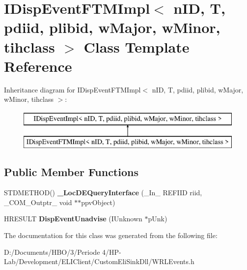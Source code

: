 \hypertarget{class_i_disp_event_f_t_m_impl}{}\section{I\+Disp\+Event\+F\+T\+M\+Impl$<$ n\+ID, T, pdiid, plibid, w\+Major, w\+Minor, tihclass $>$ Class Template Reference}
\label{class_i_disp_event_f_t_m_impl}
Inheritance diagram for I\+Disp\+Event\+F\+T\+M\+Impl$<$ n\+ID, T, pdiid, plibid, w\+Major, w\+Minor, tihclass $>$\+:\begin{figure}[H]
\begin{center}
\leavevmode
\includegraphics[height=2.000000cm]{dd/d17/class_i_disp_event_f_t_m_impl}
\end{center}
\end{figure}
\subsection*{Public Member Functions}
\begin{DoxyCompactItemize}
\item 
\mbox{\label{class_i_disp_event_f_t_m_impl_a232b97b0e6a288add95c789422a58cef}} 
S\+T\+D\+M\+E\+T\+H\+OD() {\bfseries \+\_\+\+Loc\+D\+E\+Query\+Interface} (\+\_\+\+In\+\_\+ R\+E\+F\+I\+ID riid, \+\_\+\+C\+O\+M\+\_\+\+Outptr\+\_\+ void $\ast$$\ast$ppv\+Object)
\item 
\mbox{\label{class_i_disp_event_f_t_m_impl_a3dfa6caa8bfb44e5bfa5172cdc2234c5}} 
H\+R\+E\+S\+U\+LT {\bfseries Disp\+Event\+Unadvise} (I\+Unknown $\ast$p\+Unk)
\end{DoxyCompactItemize}


The documentation for this class was generated from the following file\+:\begin{DoxyCompactItemize}
\item 
D\+:/\+Documents/\+H\+B\+O/3/\+Periode 4/\+H\+P-\/\+Lab/\+Development/\+E\+L\+I\+Client/\+Custom\+Eli\+Sink\+Dll/W\+R\+L\+Events.\+h\end{DoxyCompactItemize}
